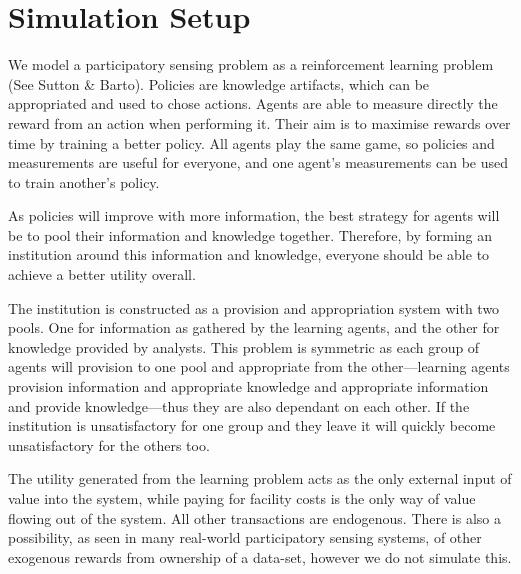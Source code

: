 \section{Simulation Setup}

We model a participatory sensing problem as a reinforcement learning problem (See Sutton \& Barto). Policies are knowledge artifacts, which can be appropriated and used to chose actions. Agents are able to measure directly the reward from an action when performing it. Their aim is to maximise rewards over time by training a better policy. All agents play the same game, so policies and measurements are useful for everyone, and one agent's measurements can be used to train another's policy.

As policies will improve with more information, the best strategy for agents will be to pool their information and knowledge together. 
Therefore, by forming an institution around this information and knowledge, everyone should be able to achieve a better utility overall.


The institution is constructed as a provision and appropriation system with two pools. One for information as gathered by the learning agents, and the other for knowledge provided by analysts. This problem is symmetric as each group of agents will provision to one pool and appropriate from the other---learning agents provision information and appropriate knowledge and appropriate information and provide knowledge---thus they are also dependant on each other. If the institution is unsatisfactory for one group and they leave it will quickly become unsatisfactory for the others too.

The utility generated from the learning problem acts as the only external input of value into the system, while paying for facility costs is the only way of value flowing out of the system. All other transactions are endogenous. There is also a possibility, as seen in many real-world participatory sensing systems, of other exogenous rewards from ownership of a data-set, however we do not simulate this.

